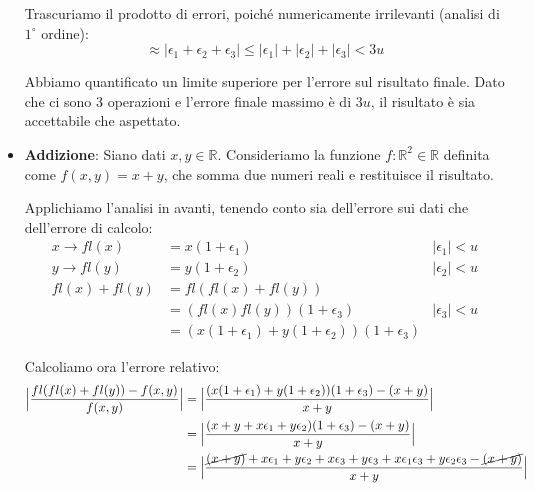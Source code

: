 \documentclass{article}
\begin{document}
\begin{itemize}
        Trascuriamo il prodotto di errori, poiché numericamente irrilevanti
        (analisi di $1^{\circ}$ ordine):
        $$\approx \lvert \epsilon_1+\epsilon_2+\epsilon_3\rvert \leq \lvert
        \epsilon_1\rvert+\lvert \epsilon_2\rvert+\lvert \epsilon_3\rvert<3u$$

        Abbiamo quantificato un limite superiore per l'errore sul risultato
        finale. Dato che ci sono 3 operazioni e l'errore finale massimo è di
        $3u$, il risultato è sia accettabile che aspettato.
    \item \textbf{Addizione}:
        Siano dati $x,y\in \mathbb{R}$. Consideriamo la funzione $f:
        \mathbb{R}^2\in \mathbb{R}$ definita come $f(x,y)=x+y$, che somma due
        numeri reali e restituisce il risultato.

        Applichiamo l'analisi in avanti, tenendo conto sia dell'errore sui dati che dell'errore di calcolo:
        \begin{equation*}
           \begin{aligned}
                x \rightarrow fl(x) &= x(1+\epsilon_1) & |\epsilon_1| < u \\
                y \rightarrow fl(y) &= y(1+\epsilon_2) & |\epsilon_2| < u \\
                fl(x) + fl(y) &= fl(fl(x)+fl(y)) \\
                              &= (fl(x)fl(y))(1+\epsilon_3) & |\epsilon_3| < u \\
                              &= (x(1+\epsilon_1) + y(1+\epsilon_2))(1+\epsilon_3)
           \end{aligned} 
        \end{equation*}

        Calcoliamo ora l'errore relativo:
        \begin{equation*}
           \begin{aligned}
                \Big\lvert \frac{fl(fl(x) + fl(y)) - f(x,y)}{f(x,y)}
                \Big\rvert &= \Big\lvert \frac{(x(1+\epsilon_1) +
                y(1+\epsilon_2))(1+\epsilon_3) - (x + y)}{x + y} \Big\rvert \\
                &= \Big\lvert
                \frac{(x+y+x\epsilon_1+y\epsilon_2)(1+\epsilon_3)-(x+y)}{x + y} \Big\rvert \\
                &= \Big\lvert
                \frac{\cancel{(x+y)}+x\epsilon_1+y\epsilon_2+x\epsilon_3+y\epsilon_3+x\epsilon_1\epsilon_3+y\epsilon_2\epsilon_3-\cancel{(x+y)}}{x+y}\Big\rvert
           \end{aligned} 
        \end{equation*}
        

\end{itemize}
\end{document}
